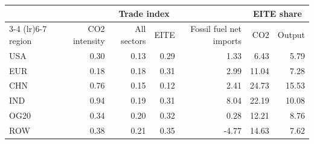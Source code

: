 \begingroup
\fontsize{12.0pt}{14.4pt}\selectfont
\begin{longtable}{lrrrrrr}
\toprule
 &  & \multicolumn{2}{c}{Trade index} &  & \multicolumn{2}{c}{EITE share} \\ 
\cmidrule(lr){3-4} \cmidrule(lr){6-7}
region & CO2 intensity & All sectors & EITE & Fossil fuel net imports & CO2 & Output \\ 
\midrule\addlinespace[2.5pt]
USA & 0.30 & 0.13 & 0.29 & 1.33 & 6.43 & 5.79 \\ 
EUR & 0.18 & 0.18 & 0.31 & 2.99 & 11.04 & 7.28 \\ 
CHN & 0.76 & 0.15 & 0.12 & 2.41 & 24.73 & 15.53 \\ 
IND & 0.94 & 0.19 & 0.31 & 8.04 & 22.19 & 10.08 \\ 
OG20 & 0.34 & 0.20 & 0.32 & 0.28 & 12.21 & 8.76 \\ 
ROW & 0.38 & 0.21 & 0.35 & -4.77 & 14.63 & 7.62 \\ 
\bottomrule
\end{longtable}
\endgroup
